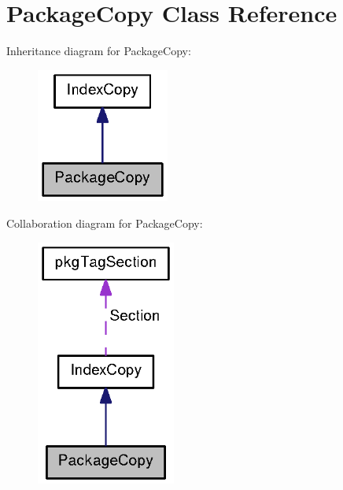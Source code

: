 \section{\-Package\-Copy \-Class \-Reference}
\label{classPackageCopy}


\-Inheritance diagram for \-Package\-Copy\-:
\nopagebreak
\begin{figure}[H]
\begin{center}
\leavevmode
\includegraphics[width=124pt]{classPackageCopy__inherit__graph}
\end{center}
\end{figure}


\-Collaboration diagram for \-Package\-Copy\-:
\nopagebreak
\begin{figure}[H]
\begin{center}
\leavevmode
\includegraphics[width=130pt]{classPackageCopy__coll__graph}
\end{center}
\end{figure}
